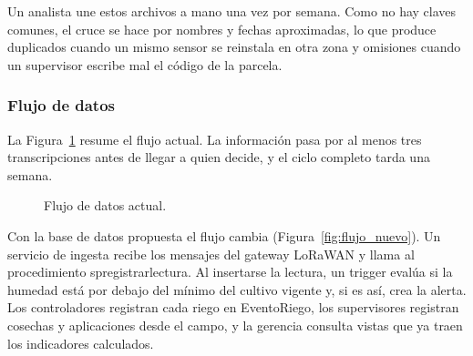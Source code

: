 \documentclass[11pt,letterpaper]{article}
\newcommand{\tbus}{\textunderscore\allowbreak}
\newcommand{\tb}[1]{{\ttfamily\let\_\tbus #1}}
\begin{document}
Un analista une estos archivos a mano una vez por semana. Como no hay claves comunes, el cruce se hace por nombres y fechas aproximadas, lo que produce duplicados cuando un mismo sensor se reinstala en otra zona y omisiones cuando un supervisor escribe mal el código de la parcela.

\subsubsection{Flujo de datos}

La Figura~\ref{fig:flujo_actual} resume el flujo actual. La información pasa por al menos tres transcripciones antes de llegar a quien decide, y el ciclo completo tarda una semana.

\begin{figure}[H]
\centering
{}
\caption{Flujo de datos actual.}
\label{fig:flujo_actual}
\end{figure}

Con la base de datos propuesta el flujo cambia (Figura~\ref{fig:flujo_nuevo}). Un servicio de ingesta recibe los mensajes del gateway LoRaWAN y llama al procedimiento \tb{sp\_registrar\_lectura}. Al insertarse la lectura, un trigger evalúa si la humedad está por debajo del mínimo del cultivo vigente y, si es así, crea la alerta. Los controladores registran cada riego en \tb{Evento\_Riego}, los supervisores registran cosechas y aplicaciones desde el campo, y la gerencia consulta vistas que ya traen los indicadores calculados.
\end{document}
